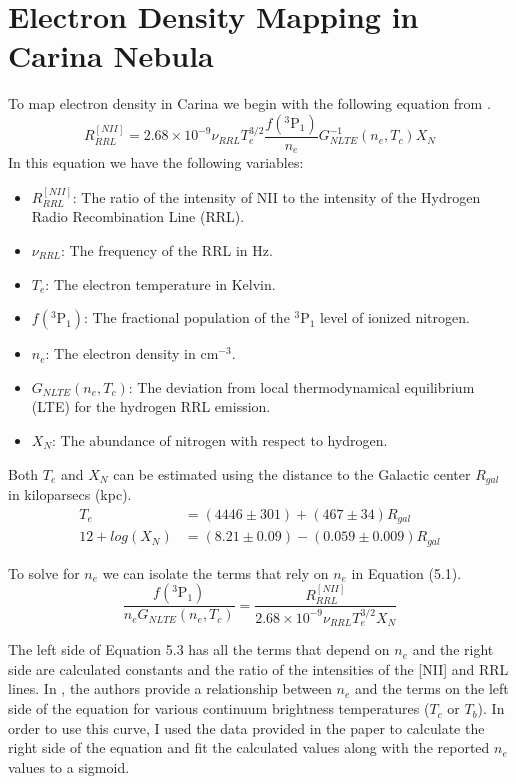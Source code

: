 \chapter[Electron Density Mapping in Carina Nebula]{Electron Density Mapping in Carina Nebula}
\label{ch:carina}

To map electron density in Carina we begin with the following equation from \cite{Pineda 2018}.
\begin{equation}
    R^{[NII]}_{RRL} = 2.68 \times 10 ^ {-9} \nu_{RRL} T_e^{3/2} \frac{f(^3\text{P}_1)}{n_e} G^{-1}_{NLTE}(n_e,T_c)X_N
    \label{eq:ratio}
\end{equation}
In this equation we have the following variables:
\begin{itemize}
    \item $R^{[NII]}_{RRL}$: The ratio of the intensity of NII to the intensity of the Hydrogen Radio Recombination Line (RRL).
    \item $\nu_{RRL}$: The frequency of the RRL in Hz.
    \item $T_e$: The electron temperature in Kelvin.
    \item $f(^3\text{P}_1)$: The fractional population of the $^3\text{P}_1$ level of ionized nitrogen. 
    \item $n_e$: The electron density in cm$^{-3}$.
    \item $G_{NLTE}(n_e,T_c)$: The deviation from local thermodynamical equilibrium (LTE) for the hydrogen RRL emission.
    \item $X_N$: The abundance of nitrogen with respect to hydrogen.
\end{itemize}

Both $T_e$ and $X_N$ can be estimated using the distance to the Galactic center $R_{gal}$ in kiloparsecs (kpc). 
\begin{align}
    T_e &= (4446 \pm 301) + (467 \pm 34) R_{gal} \\
    12 + log(X_N) &= (8.21 \pm 0.09) - (0.059 \pm 0.009) R_{gal}
\end{align}

To solve for $n_e$ we can isolate the terms that rely on $n_e$ in Equation (5.1).
\begin{equation}
    \frac{f(^3\text{P}_1)}{n_e G_{NLTE}(n_e,T_c)} = \frac{R^{[NII]}_{RRL}}{2.68 \times 10 ^ {-9} \nu_{RRL} T_e^{3/2} X_N}
\end{equation}

The left side of Equation 5.3 has all the terms that depend on $n_e$ and the right side are calculated constants and the ratio of the intensities of the [NII] and RRL lines.
In \cite{Pineda 2018}, the authors provide a relationship between $n_e$ and the terms on the left side of the equation for various continuum brightness temperatures ($T_c$ or $T_b$).
In order to use this curve, I used the data provided in the paper to calculate the right side of the equation and fit the calculated values along with the reported $n_e$ values to a sigmoid.

